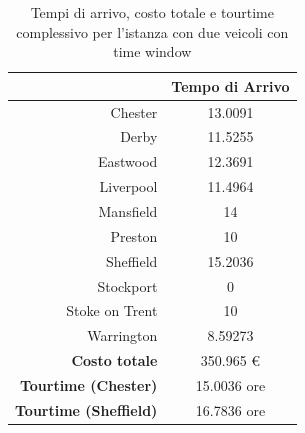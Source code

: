 
		\begin{table}[H]
			\small
			\centering
			\begin{tabular}{rc}

				\toprule
				& Tempo di Arrivo \\

				\midrule
				Chester & 13.0091 \\
				Derby  & 11.5255 \\
				Eastwood & 12.3691 \\
				Liverpool  & 11.4964 \\
				Mansfield & 14 \\
				Preston & 10 \\
				Sheffield & 15.2036 \\
				Stockport & 0 \\
				Stoke on Trent & 10 \\
				Warrington & 8.59273 \\

				\midrule
				\textbf{Costo totale} & 350.965 € \\
				\textbf{Tourtime (Chester)} & 15.0036 ore \\
				\textbf{Tourtime (Sheffield)} & 16.7836 ore \\
				\bottomrule
			\end{tabular}
			\label{table:instance_4_totale}
			\caption{Tempi di arrivo, costo totale e tourtime complessivo per l'istanza con due veicoli con time window}
		\end{table}

